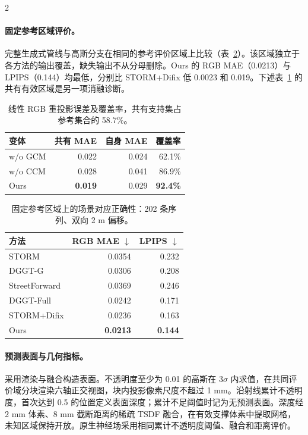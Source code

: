 \begin{multicols}{2}
\paragraph{固定参考区域评价。}
完整生成式管线与高斯分支在相同的参考评价区域上比较（表~\ref{tab:fixed-reference-correspondence}）。该区域独立于各方法的输出覆盖，缺失输出不从分母删除。Ours 的 RGB MAE（0.0213）与 LPIPS（0.144）均最低，分别比 STORM+Difix 低 0.0023 和 0.019。下述表~\ref{tab:reprojection} 的共有有效区域是另一项消融诊断。

\begin{table}[H]
\centering\small
\caption{线性 RGB 重投影误差及覆盖率，共有支持集占参考集合的 58.7\%。}
\label{tab:reprojection}
\begin{tabular}{@{}lrrr@{}}
\toprule
变体 & 共有 MAE & 自身 MAE & 覆盖率 \\
\midrule
w/o GCM & 0.022 & 0.024 & 62.1\% \\
w/o CCM & 0.028 & 0.041 & 86.9\% \\
Ours & \textbf{0.019} & 0.029 & \textbf{92.4\%} \\
\bottomrule
\end{tabular}
\end{table}

\begin{table}[H]
\centering\small
\setlength{\tabcolsep}{4pt}
\caption{固定参考区域上的场景对应正确性：202 条序列、双向 2 m 偏移。}
\label{tab:fixed-reference-correspondence}
\begin{tabular}{@{}lrr@{}}
\toprule
方法 & RGB MAE $\downarrow$ & LPIPS $\downarrow$ \\
\midrule
STORM & 0.0354 & 0.232 \\
DGGT-G & 0.0306 & 0.208 \\
StreetForward & 0.0369 & 0.246 \\
DGGT-Full & 0.0242 & 0.171 \\
STORM+Difix & 0.0236 & 0.163 \\
Ours & \textbf{0.0213} & \textbf{0.144} \\
\bottomrule
\end{tabular}
\end{table}

\paragraph{预测表面与几何指标。}
采用渲染与融合构造表面。不透明度至少为 0.01 的高斯在 $3\sigma$ 内求值，在共同评价域分块渲染六轴正交视图，块内投影像素尺度不超过 1 mm。沿射线累计不透明度，首次达到 0.5 的位置定义表面深度；累计不足阈值时记为无预测表面。深度经 2 mm 体素、8 mm 截断距离的稀疏 TSDF 融合，在有效支撑体素中提取网格，未知区域保持开放。原生神经场采用相同累计不透明度阈值、融合和距离评价。


\end{multicols}
